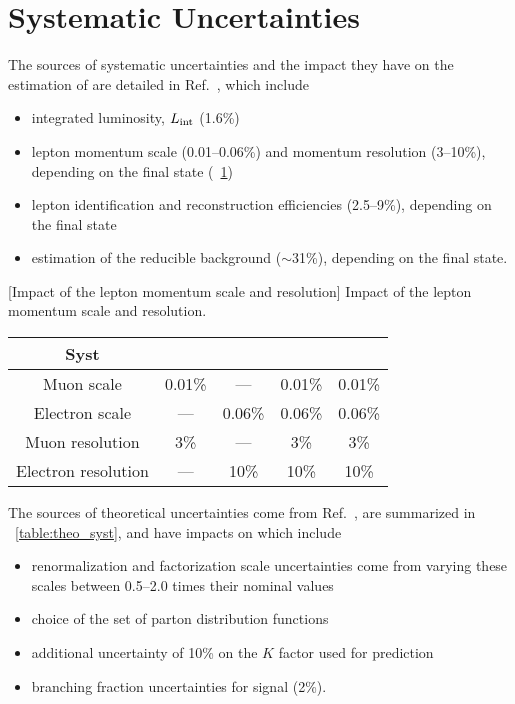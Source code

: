 \section{Systematic Uncertainties}
\label{sec:syst_uncert}
The sources of systematic uncertainties and the impact they have on the estimation of \mfourl are detailed in Ref.~\cite{HIG_21_019}, which include
\begin{itemize}
	\item integrated luminosity, $L_\text{int}$ (1.6\%)~\cite{LUM_17_003, LUM_17_004, LUM_18_002}
	\item lepton momentum scale (0.01--0.06\%) and momentum resolution (3--10\%), depending on the final state (\tablename~\ref{table:ScaleRes_syst})
	\item lepton identification and reconstruction efficiencies (2.5--9\%), depending on the final state
	\item estimation of the reducible background ($\sim$31\%), depending on the final state.
\end{itemize}
\begin{table}[ht]
	\begin{center}
		\topcaption
		[Impact of the lepton momentum scale and resolution]
		{Impact of the lepton momentum scale and resolution.}
                \begin{tabular}{ccccc}
		\hline
		Syst	&	\fourmu	&	\foure	&	\twoetwomu	&	\twomutwoe	\\
		\hline
		Muon scale	&	0.01\%	&	---	&	0.01\%	&	0.01\%	\\
		Electron scale	&	---	&	0.06\%	&	0.06\%	&	0.06\%	\\
		\hline
		Muon resolution	&	3\%	&	---	&	3\%	&	3\%	\\
		Electron resolution	&	---	&	10\%	&       10\%&       10\%	\\
		\hline
		\end{tabular}
		\label{table:ScaleRes_syst}
	\end{center}
\end{table}
The sources of theoretical uncertainties come from Ref.~\cite{HIG_19_001},
are summarized in \tablename~\ref{table:theo_syst},
and have impacts on \mfourl which include
\begin{itemize}
	\item renormalization and factorization scale uncertainties come from varying these scales between 0.5--2.0 times their nominal values
	\item choice of the set of parton distribution functions~\cite{Alekhin:2011sk, Botje:2011sn}
	\item additional uncertainty of 10\% on the $K$ factor used for \ggzzfourl prediction
	\item branching fraction uncertainties for \hzzfourl signal (2\%).
\end{itemize}
